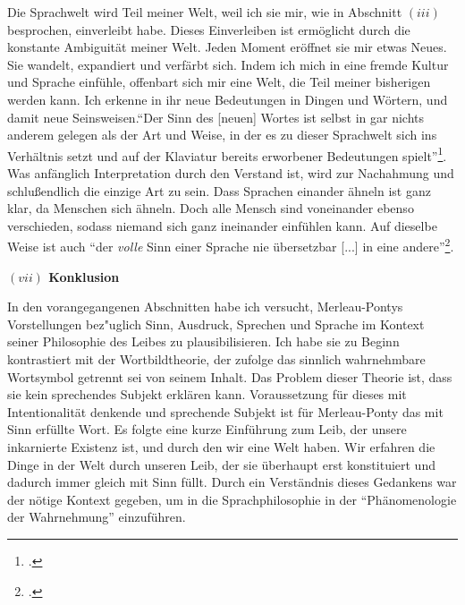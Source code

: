 \documentclass[a4paper, 12pt]{article}
\begin{document}
\begin{onehalfspace}
Die Sprachwelt wird Teil meiner Welt, weil ich sie mir, wie in Abschnitt $(iii)$ besprochen, einverleibt habe. Dieses Einverleiben ist ermöglicht durch die konstante Ambiguität meiner Welt. Jeden Moment eröffnet sie mir etwas Neues. Sie wandelt, expandiert und verfärbt sich. Indem ich mich in eine fremde Kultur und Sprache einfühle, offenbart sich mir eine Welt, die Teil meiner bisherigen werden kann. Ich erkenne in ihr neue Bedeutungen in Dingen und Wörtern, und damit neue Seinsweisen."`Der Sinn des [neuen] Wortes ist selbst in gar nichts anderem gelegen als der Art und Weise, in der es zu dieser Sprachwelt sich ins Verhältnis setzt und auf der Klaviatur bereits erworbener Bedeutungen spielt"'\footnote{\Cite[Siehe][S. 221]{merleau1966phanomenologie}.}. Was anfänglich Interpretation durch den Verstand ist, wird zur Nachahmung und schlußendlich die einzige Art zu sein. Dass Sprachen einander ähneln ist ganz klar, da Menschen sich ähneln. Doch alle Mensch sind voneinander ebenso verschieden, sodass niemand sich ganz ineinander einfühlen kann. Auf dieselbe Weise ist auch "`der \emph{volle} Sinn einer Sprache nie übersetzbar [...] in eine andere"'\footnote{\Cite[Siehe][S. 222]{merleau1966phanomenologie}.}.




\vspace{5mm}

\noindent\textbf{$(vii)$ Konklusion}

\noindent In den vorangegangenen Abschnitten habe ich versucht, Merleau-Pontys Vorstellungen bez"uglich Sinn, Ausdruck, Sprechen und Sprache im Kontext seiner Philosophie des Leibes zu plausibilisieren. Ich habe sie zu Beginn kontrastiert mit der Wortbildtheorie, der zufolge das sinnlich wahrnehmbare Wortsymbol getrennt sei von seinem Inhalt. Das Problem dieser Theorie ist, dass sie kein sprechendes Subjekt erklären kann. Voraussetzung für dieses mit Intentionalität denkende und sprechende Subjekt ist für Merleau-Ponty das mit Sinn erfüllte Wort. Es folgte eine kurze Einführung zum Leib, der unsere inkarnierte Existenz ist, und durch den wir eine Welt haben. Wir erfahren die Dinge in der Welt durch unseren Leib, der sie überhaupt erst konstituiert und dadurch immer gleich mit Sinn füllt. Durch ein Verständnis dieses Gedankens war der nötige Kontext gegeben, um in die Sprachphilosophie in der "`Phänomenologie der Wahrnehmung"' einzuführen. 


\end{onehalfspace}
\end{document}
